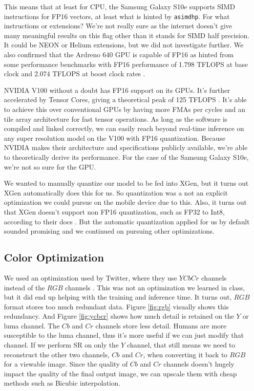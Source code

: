 \documentclass{article}
\begin{document}
This means that at least for CPU, the Samsung Galaxy S10e supports SIMD instructions for FP16 vectors, at least what is hinted by \verb|asimdhp|. For what instructions or extensions? We're not really sure as the internet doesn't give many meaningful results on this flag other than it stands for SIMD half precision. It could be NEON or Helium extensions, but we did not investigate further. We also confirmed that the Ardreno 640 GPU is capable of FP16 as hinted from some performance benchmarks with FP16 performance of 1.798 TFLOPS at base clock and 2.074 TFLOPS at boost clock rates \cite{ardreno640}.

NVIDIA V100 without a doubt has FP16 support on its GPUs. It's further accelerated by Tensor Cores, giving a theoretical peak of 125 TFLOPS \cite{v100}. It's able to achieve this over conventional GPUs by having more FMAs per cycles and an tile array architecture for fast tensor operations. As long as the software is compiled and linked correctly, we can easily reach beyond real-time inference on any super resolution model on the V100 with FP16 quantization. Because NVIDIA makes their architecture and specifications publicly available, we're able to theoretically derive its performance. For the case of the Samsung Galaxy S10e, we're not so sure for the GPU. 

We wanted to manually quantize our model to be fed into XGen, but it turns out XGen automatically does this for us. So quantization was a not an explicit optimization we could pursue on the mobile device due to this. Also, it turns out that XGen doesn't support non FP16 quantization, such as FP32 to Int8, according to their docs \cite{xgen-docs, issue26}. But the automatic quantization applied for us by default sounded promising and we continued on pursuing other optimizations.

\subsection{Color Optimization}
We used an optimization used by Twitter, where they use $YCbCr$ channels instead of the $RGB$ channels \cite{twitter-superresolution}. This was not an optimization we learned in class, but it did end up helping with the training and inference time. It turns out, $RGB$ format stores too much redundant data. Figure \ref{fig:rgb} visually shows this redundancy. And Figure \ref{fig:ycbcr} shows how much detail is retained on the $Y$ or luma channel. The $Cb$ and $Cr$ channels store less detail. Humans are more susceptible to the luma channel, thus it's more useful if we can just modify that channel. If we perform SR on only the $Y$ channel, that still means we need to reconstruct the other two channels, $Cb$ and $Cr$, when converting it back to $RGB$ for a viewable image. Since the quality of $Cb$ and $Cr$ channels doesn't hugely impact the quality of the final output image, we can upscale them with cheap methods such as Bicubic interpolation.
\end{document}
